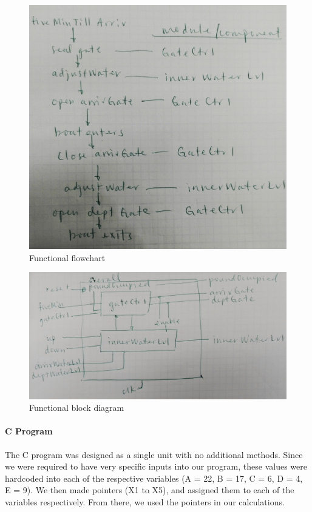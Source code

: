 \documentclass{article}
\begin{document}
      \begin{figure}[H]
        \centering
        \includegraphics[width=0.75\linewidth]{figures/functional_flowchart.jpeg}
        \caption{Functional flowchart}
        \label{fig:functional_flowchart}
      \end{figure}

      \begin{figure}[H]
        \centering
        \includegraphics[width=0.75\linewidth]{figures/functional_blockdiagram.jpeg}
        \caption{Functional block diagram}
        \label{fig:functional_blockdiagram}
      \end{figure}

      \paragraph{C Program} The C program was designed as a single unit with no additional methods. Since we were required to have very specific inputs into our program, these values were hardcoded into each of the respective variables (A = 22, B = 17, C = 6, D = 4, E = 9). We then made pointers (X1 to X5), and assigned them to each of the variables respectively. From there, we used the pointers in our calculations.
\end{document}
